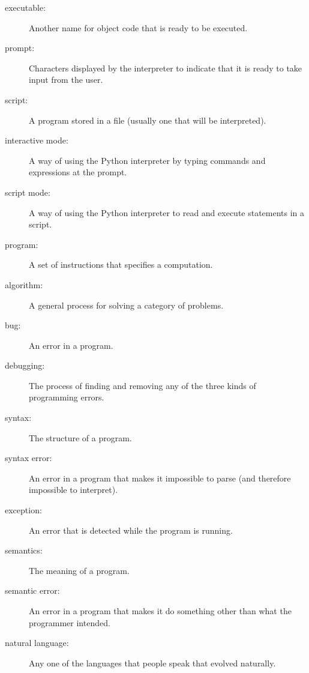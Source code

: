 \documentclass[10pt]{book}
\begin{document}
\begin{description}
\item[executable:]  Another name for object code that is ready
to be executed.

\item[prompt:] Characters displayed by the interpreter to indicate
that it is ready to take input from the user.

\item[script:] A program stored in a file (usually one that will be
interpreted).

\item[interactive mode:] A way of using the Python interpreter by
typing commands and expressions at the prompt.

\item[script mode:] A way of using the Python interpreter to read
and execute statements in a script.

\item[program:] A set of instructions that specifies a computation.

\item[algorithm:]  A general process for solving a category of
problems.

\item[bug:]  An error in a program.

\item[debugging:]  The process of finding and removing any of the
three kinds of programming errors.

\item[syntax:]  The structure of a program.

\item[syntax error:]  An error in a program that makes it impossible
to parse (and therefore impossible to interpret).

\item[exception:]  An error that is detected while the program is running.

\item[semantics:]  The meaning of a program.

\item[semantic error:]   An error in a program that makes it do something
other than what the programmer intended.

\item[natural language:]  Any one of the languages that people speak that
evolved naturally.


\end{description}
\end{document}
